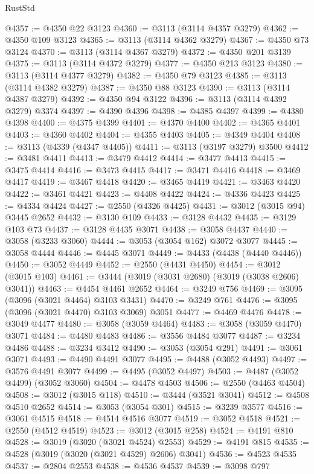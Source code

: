 \begin{lexlean}{RustStd}
\begin{coremodule}
{\begin{coremodule}
{{{{{{{{{{{{{{{{{{{{{{{{{{{{{{{{@4357 := @4350 @22 @3123
@4360 := @3113 (@3114 @4357 @3279)
@4362 := @4350 @109 @3123
@4365 := @3113 (@3114 @4362 @3279)
@4367 := @4350 @73 @3124
@4370 := @3113 (@3114 @4367 @3279)
@4372 := @4350 @201 @3139
@4375 := @3113 (@3114 @4372 @3279)
@4377 := @4350 @213 @3123
@4380 := @3113 (@3114 @4377 @3279)
@4382 := @4350 @79 @3123
@4385 := @3113 (@3114 @4382 @3279)
@4387 := @4350 @88 @3123
@4390 := @3113 (@3114 @4387 @3279)
@4392 := @4350 @94 @3122
@4396 := @3113 (@3114 @4392 @3279) @3374
@4397 := @4390 @4396
@4398 := @4385 @4397
@4399 := @4380 @4398
@4400 := @4375 @4399
@4401 := @4370 @4400
@4402 := @4365 @4401
@4403 := @4360 @4402
@4404 := @4355 @4403
@4405 := @4349 @4404
@4408 := @3113 (@4339 (@4347 @4405))
@4411 := @3113 (@3197 @3279) @3500
@4412 := @3481 @4411
@4413 := @3479 @4412
@4414 := @3477 @4413
@4415 := @3475 @4414
@4416 := @3473 @4415
@4417 := @3471 @4416
@4418 := @3469 @4417
@4419 := @3467 @4418
@4420 := @3465 @4419
@4421 := @3463 @4420
@4422 := @3461 @4421
@4423 := @4408 @4422
@4424 := @4336 @4423
@4425 := @4334 @4424
@4427 := @2550 (@4326 @4425)
@4431 := @3012 (@3015 @94) @3445 @2652
@4432 := @3130 @109
@4433 := @3128 @4432
@4435 := @3129 @103 @73
@4437 := @3128 @4435 @3071
@4438 := @3058 @4437
@4440 := @3058 (@3233 @3060)
@4444 := @3053 (@3054 @162) @3072 @3077
@4445 := @3058 @4444
@4446 := @4445 @3071
@4449 := @4433 (@4438 (@4440 @4446))
@4450 := @3052 @4449
@4452 := @2550 (@4431 @4450)
@4454 := @3012 (@3015 @103)
@4461 := @3444 (@3019 (@3031 @2680) (@3019 (@3038 @2606) @3041))
@4463 := @4454 @4461 @2652
@4464 := @3249 @756
@4469 := @3095 (@3096 (@3021 @4464) @3103 @3431)
@4470 := @3249 @761
@4476 := @3095 (@3096 (@3021 @4470) @3103 @3069) @3051
@4477 := @4469 @4476
@4478 := @3049 @4477
@4480 := @3058 (@3059 @4464)
@4483 := @3058 (@3059 @4470) @3071
@4484 := @4480 @4483
@4486 := @3556 @4484 @3077
@4487 := @3234 @4486
@4488 := @3234 @3412
@4490 := @3053 (@3054 @291)
@4491 := @3061 @3071
@4493 := @4490 @4491 @3077
@4495 := @4488 (@3052 @4493)
@4497 := @3576 @4491 @3077
@4499 := @4495 (@3052 @4497)
@4503 := @4487 (@3052 @4499) (@3052 @3060)
@4504 := @4478 @4503
@4506 := @2550 (@4463 @4504)
@4508 := @3012 (@3015 @118)
@4510 := @3444 (@3521 @3041)
@4512 := @4508 @4510 @2652
@4514 := @3053 (@3054 @301)
@4515 := @3239 @3577
@4516 := @3061 @4515
@4518 := @4514 @4516 @3077
@4519 := @3052 @4518
@4521 := @2550 (@4512 @4519)
@4523 := @3012 (@3015 @258)
@4524 := @4191 @810
@4528 := @3019 (@3020 (@3021 @4524) @2553)
@4529 := @4191 @815
@4535 := @4528 (@3019 (@3020 (@3021 @4529) @2606) @3041)
@4536 := @4523 @4535
@4537 := @2804 @2553
@4538 := @4536 @4537
@4539 := @3098 @797
}}}}}}}}}}}}}}}}}}}}}}}}}}}}}}}}
\end{coremodule}}
\end{coremodule}
\end{lexlean}
